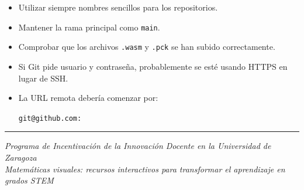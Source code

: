 \documentclass[11pt,a4paper]{article}
\begin{document}
\begin{tcolorbox}[
	colback=lightblue,
	colframe=godotblue
]
\begin{itemize}
	\item Utilizar siempre nombres sencillos para los repositorios.
	\item Mantener la rama principal como \texttt{main}.
	\item Comprobar que los archivos \texttt{.wasm} y \texttt{.pck} se han subido correctamente.
	\item Si Git pide usuario y contraseña, probablemente se esté usando HTTPS en lugar de SSH.
	\item La URL remota debería comenzar por:
	
\begin{center}
\texttt{git@github.com:}
\end{center}

\end{itemize}
\end{tcolorbox}

\vfill

\begin{center}
\rule{0.5\textwidth}{0.4pt}

\vspace{0.2cm}

\textit{Programa de Incentivación de la Innovación Docente en la Universidad de Zaragoza}\\
\textit{Matemáticas visuales: recursos interactivos para transformar el aprendizaje en grados STEM}

\end{center}
\end{document}
